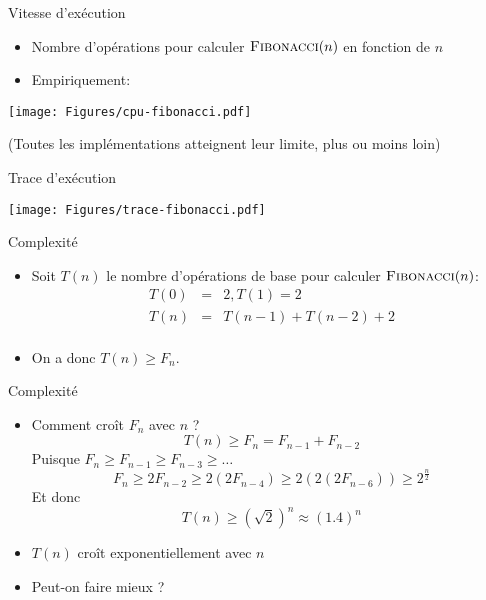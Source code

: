 \begin{frame}{Vitesse d'exécution}
\begin{itemize}
\item Nombre d'opérations pour calculer $\textnormal{\scshape Fibonacci}(n)$ en fonction de $n$
\item Empiriquement:
\end{itemize}

\begin{center}
\texttt{[image: Figures/cpu-fibonacci.pdf]}
\end{center}

(Toutes les implémentations atteignent leur limite, plus ou moins loin)
\end{frame}

\begin{frame}{Trace d'exécution}
\centerline{\texttt{[image: Figures/trace-fibonacci.pdf]}}
\end{frame}

\begin{frame}{Complexité}
\begin{center}
\end{center}

\bigskip

\begin{itemize}
\item Soit $T(n)$ le nombre d'opérations de base pour calculer $\textnormal{\scshape Fibonacci}(n)$:
\begin{eqnarray*}
T(0) & = & 2, T(1)=2\\
T(n) & = & T(n-1)+T(n-2)+2\\
\end{eqnarray*}
\item On a donc $T(n)\geq F_n$.
\end{itemize}

\end{frame}

\begin{frame}{Complexité}

\begin{itemize}
\item Comment croît $F_n$ avec $n$ ?
$$T(n)\geq F_n=F_{n-1}+F_{n-2}$$
Puisque $F_n\geq F_{n-1}\geq F_{n-3}\geq\ldots$
$$F_n\geq 2 F_{n-2}\geq 2(2 F_{n-4})\geq 2(2(2 F_{n-6})) \geq 2^{\frac{n}{2}}$$
Et donc
$$T(n)\geq (\sqrt{2})^n \approx (1.4)^n$$
\item $T(n)$ croît \alert{exponentiellement} avec $n$

\bigskip

\item Peut-on faire mieux ?
\end{itemize}
\end{frame}

